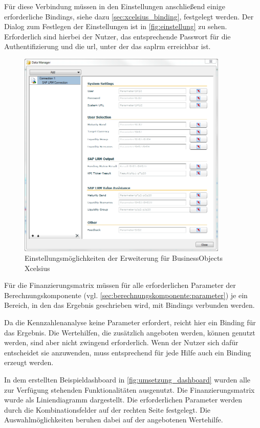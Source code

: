 \begin{onehalfspacing}
Für diese Verbindung müssen in den Einstellungen anschließend einige erforderliche Bindings, siehe dazu \vref{sec:xcelsius_binding}, festgelegt werden. Der Dialog zum Festlegen der Einstellungen ist in \vref{fig:einstellung} zu sehen. Erforderlich sind hierbei der Nutzer, das entsprechende Passwort für die Authentifizierung und die \gls{url}, unter der das \gls{saplrm} erreichbar ist.

\begin{figure}[ht]
\centering
\setlength{\unitlength}{1mm}
\includegraphics[width=10cm]{images/xcelsius_einstellungen.PNG}
\caption{Einstellungsmöglichkeiten der Erweiterung für BusinessObjects Xcelsius\label{fig:einstellung}}
\end{figure} 

Für die Finanzierungsmatrix müssen für alle erforderlichen Parameter der Berechnungskomponente (vgl. \vref{sec:berechnungskomponente:parameter}) je ein Bereich, in den das Ergebnis geschrieben wird, mit Bindings verbunden werden.

Da die Kennzahlenanalyse keine Parameter erfordert, reicht hier ein Binding für das Ergebnis. Die Wertehilfen, die zusätzlich angeboten werden, können genutzt werden, sind aber nicht zwingend erforderlich. Wenn der Nutzer sich dafür entscheidet sie anzuwenden, muss entsprechend für jede Hilfe auch ein Binding erzeugt werden.

In dem erstellten Beispieldashboard in \vref{fig:umsetzung_dashboard} wurden alle zur Verfügung stehenden Funktionalitäten ausgenutzt. Die Finanzierungsmatrix wurde als Liniendiagramm dargestellt. Die erforderlichen Parameter werden durch die Kombinationsfelder auf der rechten Seite festgelegt. Die Auswahlmöglichkeiten beruhen dabei auf der angebotenen Wertehilfe. 


\end{onehalfspacing}
